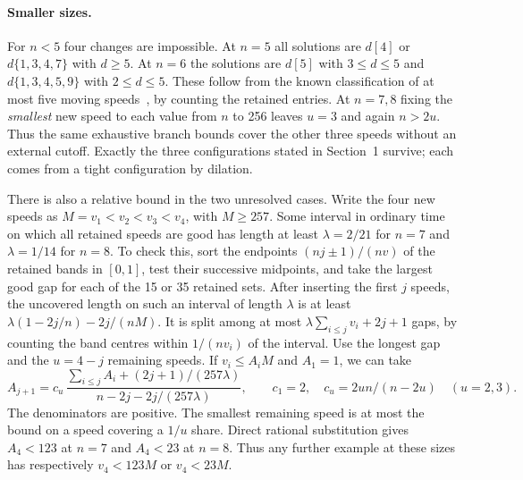 \paragraph{Smaller sizes.}
For $n<5$ four changes are impossible. At $n=5$ all solutions are $d[4]$ or $d\{1,3,4,7\}$ with $d\ge5$. At $n=6$ the solutions are $d[5]$ with $3\le d\le5$ and $d\{1,3,4,5,9\}$ with $2\le d\le5$. These follow from the known classification of at most five moving speeds~\cite[Sec.~1.2]{Z}, by counting the retained entries. At $n=7,8$ fixing the \emph{smallest} new speed to each value from $n$ to 256 leaves $u=3$ and again $n>2u$. Thus the same exhaustive branch bounds cover the other three speeds without an external cutoff. Exactly the three configurations stated in Section~1 survive; each comes from a tight configuration by dilation.

There is also a relative bound in the two unresolved cases. Write the four new speeds as $M=v_1<v_2<v_3<v_4$, with $M\ge257$. Some interval in ordinary time on which all retained speeds are good has length at least $\lambda=2/21$ for $n=7$ and $\lambda=1/14$ for $n=8$. To check this, sort the endpoints $(nj\pm1)/(nv)$ of the retained bands in $[0,1]$, test their successive midpoints, and take the largest good gap for each of the 15 or 35 retained sets. After inserting the first $j$ speeds, the uncovered length on such an interval of length $\lambda$ is at least $\lambda(1-2j/n)-2j/(nM)$. It is split among at most $\lambda\sum_{i\le j}v_i+2j+1$ gaps, by counting the band centres within $1/(nv_i)$ of the interval. Use the longest gap and the $u=4-j$ remaining speeds. If $v_i\le A_i M$ and $A_1=1$, we can take
\[
 A_{j+1}=c_u\,\frac{\sum_{i\le j}A_i+(2j+1)/(257\lambda)}
 {n-2j-2j/(257\lambda)},\qquad
 c_1=2,\quad c_u=2un/(n-2u)\quad(u=2,3).
\]
The denominators are positive. The smallest remaining speed is at most the bound on a speed covering a $1/u$ share. Direct rational substitution gives $A_4<123$ at $n=7$ and $A_4<23$ at $n=8$. Thus any further example at these sizes has respectively $v_4<123M$ or $v_4<23M$.
